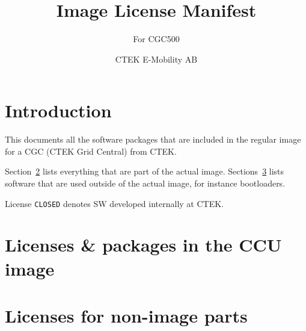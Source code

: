 \documentclass{scrartcl}
\title{Image License Manifest}
\subtitle{For CGC500 }
\author{CTEK E-Mobility AB}
\begin{document}
\maketitle

\section{Introduction}
\label{sec:introduction}

This documents all the software packages that are included in the regular
image for a CGC (CTEK Grid Central) from CTEK.

Section~\ref{sec:lic-pack} lists everything that are part of the actual image.
Sections~\ref{sec:licenses-non-image} lists software that are used outside of
the actual image, for instance bootloaders.

License \lstinline{CLOSED} denotes SW developed internally at CTEK.

\section{Licenses \& packages in the CCU image}
\label{sec:lic-pack}



\section{Licenses for non-image parts}
\label{sec:licenses-non-image}


\end{document}
